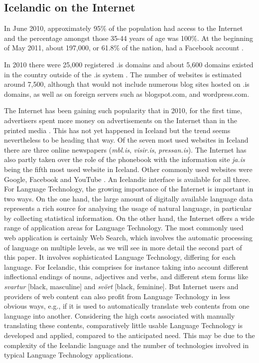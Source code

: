 \begin{multicols}{2}
\subsection{Icelandic on the Internet}

In June 2010, approximately 95\% of the population had access to the Internet \cite{sta1} and the percentage amongst those 35-44 years of age was 100\%. At the beginning of May 2011, about 197,000, or 61.8\% of the nation, had a Facebook account \cite{fac1}.  

In 2010 there were 25,000 registered .is domains \cite{len1} and about 5,600 domains existed in the country outside of the .is system \cite{len2}. The number of websites is estimated around 7,500, although that would not include numerous blog sites hosted on .is domains, as well as on foreign servers such as blogspot.com, and wordpress.com. 

The Internet has been gaining such popularity that in 2010, for the first time, advertisers spent more money on advertisements on the Internet than in the printed media \cite{abs1}. This has not yet happened in Iceland but the trend seems nevertheless to be heading that way. Of the seven most used websites in Iceland there are three online newspapers (\textit{mbl.is}, \textit{visir.is}, \textit{pressan.is}). The Internet has also partly taken over the role of the phonebook with the information site \textit{ja.is} being the fifth most used website in Iceland. Other commonly used websites were Google, Facebook and YouTube \cite{abs2}. An Icelandic interface is available for all three.
For Language Technology, the growing importance of the Internet is important in two ways. On the one hand, the large amount of digitally available language data represents a rich source for analysing the usage of natural language, in particular by collecting statistical information. On the other hand, the Internet offers a wide range of application areas for Language Technology. 
The most commonly used web application is certainly Web Search, which involves the automatic processing of language on multiple levels, as we will see in more detail the second part of this paper. It involves sophisticated Language Technology, differing for each language. For Icelandic, this comprises for instance taking into account different inflectional endings of nouns, adjectives and verbs, and different stem forms like \textit{svart\-ur} {[}black, masculine{]} and \textit{svört} {[}black, feminine{]}. 
But Internet users and providers of web content can also profit from Language Technology in less obvious ways, e.g., if it is used to automatically translate web contents from one language into another. Considering the high costs associated with manually translating these contents, comparatively little usable Language Technology is developed and applied, compared to the anticipated need. This may be due to the complexity of the Icelandic language and the number of technologies involved in typical Language Technology applications. 


\end{multicols}

